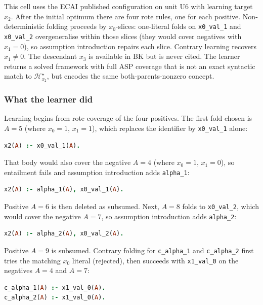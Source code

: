 \documentclass[11pt]{article}
\begin{document}
This cell uses the ECAI published configuration on unit U6 with learning target \(x_2\). After the initial optimum there are four rote rules, one for each positive. Non-deterministic folding proceeds by \(x_0\)-slices: one-literal folds on \texttt{x0\_val\_1} and \texttt{x0\_val\_2} overgeneralise within those slices (they would cover negatives with \(x_1=0\)), so assumption introduction repairs each slice. Contrary learning recovers \(x_1\neq 0\). The descendant \(x_3\) is available in BK but is never cited. The learner returns a solved framework with full ASP coverage that is not an exact syntactic match to \(\mathcal{H}_{x_2}^\star\), but encodes the same both-parents-nonzero concept.

\subsubsection{What the learner did}

Learning begins from rote coverage of the four positives. The first fold chosen is \(A=5\) (where \(x_0=1\), \(x_1=1\)), which replaces the identifier by \texttt{x0\_val\_1} alone:

\begin{lstlisting}[style=logic,language=Prolog]
x2(A) :- x0_val_1(A).
\end{lstlisting}

That body would also cover the negative \(A=4\) (where \(x_0=1\), \(x_1=0\)), so entailment fails and assumption introduction adds \texttt{alpha\_1}:

\begin{lstlisting}[style=logic,language=Prolog]
x2(A) :- alpha_1(A), x0_val_1(A).
\end{lstlisting}

Positive \(A=6\) is then deleted as subsumed. Next, \(A=8\) folds to \texttt{x0\_val\_2}, which would cover the negative \(A=7\), so assumption introduction adds \texttt{alpha\_2}:

\begin{lstlisting}[style=logic,language=Prolog]
x2(A) :- alpha_2(A), x0_val_2(A).
\end{lstlisting}

Positive \(A=9\) is subsumed. Contrary folding for \texttt{c\_alpha\_1} and \texttt{c\_alpha\_2} first tries the matching \(x_0\) literal (rejected), then succeeds with \texttt{x1\_val\_0} on the negatives \(A=4\) and \(A=7\):

\begin{lstlisting}[style=logic,language=Prolog]
c_alpha_1(A) :- x1_val_0(A).
c_alpha_2(A) :- x1_val_0(A).
\end{lstlisting}
\end{document}
